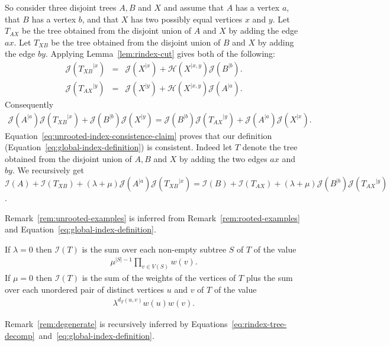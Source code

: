 \documentclass[11 pt]{modarticle}
\newcommand{\wmap}{w}
\newcommand{\size}[1]{|#1|}
\newcommand{\vsetof}[1]{V(#1)}
\newcommand{\distance}[3]{d_{#3}(#1,#2)}
\newcommand{\rtree}[2]{{#1}^{\lvert #2}}
\newcommand{\indexsymbol}{\mathcal{I}}
\newcommand{\tindex}[1]{\indexsymbol(#1)}
\newcommand{\rindexsymbol}{\mathcal{J}}
\newcommand{\rindex}[2]{\rindexsymbol(\rtree{#2}{#1})}
\newcommand{\aindexsymbol}{\mathcal{H}}
\newcommand{\aindex}[3]{\aindexsymbol(\rtree{#3}{#1, #2})}
\begin{document}
So consider three disjoint trees $A, B$ and $X$ and assume that $A$ has a vertex $a$, that $B$ has a vertex $b$, and that $X$ has two possibly equal vertices $x$ and $y$. Let $T_{AX}$ be the tree obtained from the disjoint union of $A$ and $X$ by adding the edge $ax$. Let $T_{XB}$ be the tree obtained from the disjoint union of $B$ and $X$ by adding the edge $by$. Applying Lemma~\ref{lem:rindex-cut} gives both of the following:
\begin{eqnarray*}
	\rindex{x}{T_{XB}} & = & \rindex{x}{X} + \aindex{x}{y}{X} \rindex{b}{B}. \\
	\rindex{y}{T_{AX}} & = & \rindex{y}{X} + \aindex{x}{y}{X} \rindex{a}{A}.
\end{eqnarray*} 
Consequently
\begin{eqnarray}
	\rindex{a}{A} \rindex{x}{T_{XB}} + \rindex{b}{B} \rindex{y}{X} = \rindex{b}{B} \rindex{y}{T_{AX}} + \rindex{a}{A} \rindex{x}{X}. \label{eq:unrooted-index-consistence-claim}
\end{eqnarray}
Equation~\eqref{eq:unrooted-index-consistence-claim} proves that our definition (Equation~\eqref{eq:global-index-definition}) is consistent. Indeed let $T$ denote the tree obtained from the disjoint union of $A,B$ and $X$ by adding the two edges $ax$ and $by$. We recursively get $\tindex{A} + \tindex{T_{XB}} + (\lambda + \mu) \rindex{a}{A} \rindex{x}{T_{XB}} = \tindex{B} + \tindex{T_{AX}} + (\lambda + \mu) \rindex{b}{B} \rindex{y}{T_{AX}}$.

Remark~\ref{rem:unrooted-examples} is inferred from Remark~\ref{rem:rooted-examples} and Equation~\eqref{eq:global-index-definition}.

\begin{rem}\label{rem:unrooted-examples}
If $\lambda = 0$ then $\tindex{T}$ is the sum over each non-empty subtree $S$ of $T$ of the value
\begin{eqnarray*}
	\mu^{\size{S}-1} \underset{v \in \vsetof{S}}{\prod} \wmap(v).
\end{eqnarray*}
If $\mu = 0$ then $\tindex{T}$ is the sum of the weights of the vertices of $T$ plus the sum over each unordered pair of distinct vertices $u$ and $v$ of $T$ of the value
\begin{eqnarray*}
	\lambda^{\distance{u}{v}{T}} \wmap(u) \wmap(v).
\end{eqnarray*}
\end{rem}

Remark~\ref{rem:degenerate} is recursively inferred by Equations~\eqref{eq:rindex-tree-decomp}~and~\eqref{eq:global-index-definition}.
\end{document}
